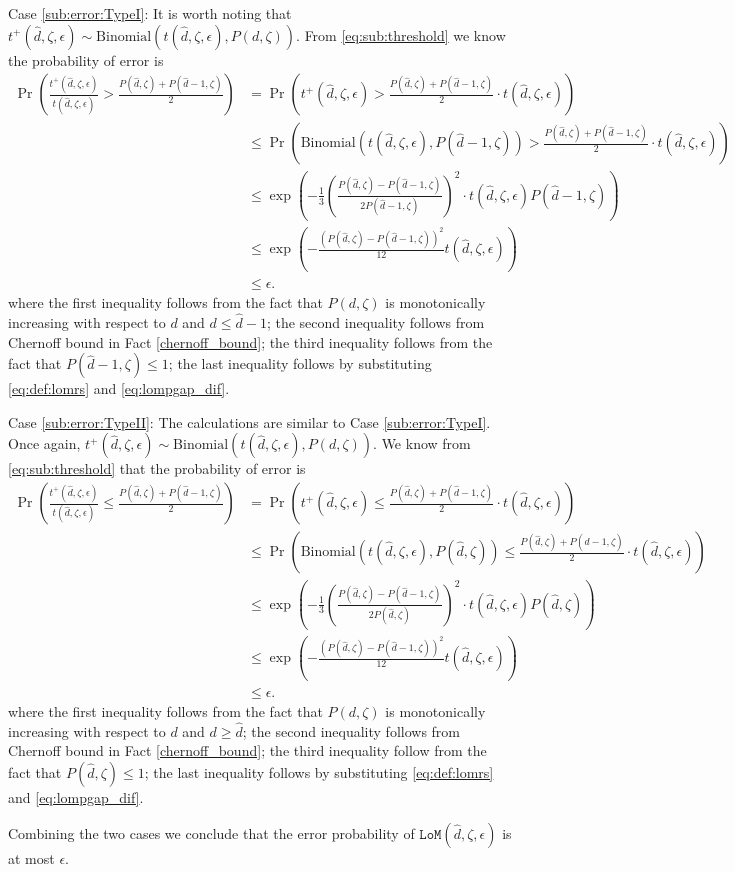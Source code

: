 \documentclass[onecolumn,letterpaper]{IEEEtran}
\newcommand{\lom}{{\texttt{LoM}}}
\newcommand{\lomerr}{{\epsilon}}
\newcommand{\ud}{{\hat{d}}}
\newcommand{\lomp}{{P}}
\newcommand{\lomcp}{{\zeta}}
\newcommand{\lomrs}{{t(\ud,\lomcp,\lomerr)}}
\newcommand{\lompo}{{t^{+}(\ud,\lomcp,\lomerr)}}
\newcommand{\lomppd}{{\lomp(d,\lomcp)}}
\newcommand{\lompp}{{\lomp(\ud,\lomcp)}}
\newcommand{\lomppo}{{\lomp(\ud-1,\lomcp)}}
\begin{document}
\begin{IEEEproof}
    Case \ref{sub:error:TypeI}: It is worth noting that $\lompo \sim \text{Binomial} \left(\lomrs , \lomppd\right)$. From \eqref{eq:sub:threshold} we know the probability of error is
    \begin{align*}
        \Pr \left( \frac{\lompo}{\lomrs} > \frac{\lompp + \lomppo}{2} \right) &= \Pr \left( \lompo > \frac{\lompp + \lomppo}{2}\cdot\lomrs \right)\\
        &\le \Pr \left( \text{Binomial} \left(\lomrs , \lomppo\right) > \frac{\lompp + \lomppo}{2} \cdot \lomrs \right) \\
        &\le \exp \left( -\frac{1}{3} \left( \frac{\lompp-\lomppo}{2\lomppo} \right)^2 \cdot\lomrs \lomppo\right) \\
        &\le \exp \left( - \frac{\left(\lompp-\lomppo\right)^2}{12} \lomrs \right) \\
        &\leq \lomerr.
    \end{align*}
       where the first inequality follows from the fact that $\lomppd$ is monotonically increasing with respect to $d$ and $d \leq \ud-1$; the second inequality follows from Chernoff bound in Fact \ref{chernoff_bound}; the third inequality follows from the fact that $\lomppo\leq 1$; the last inequality follows by substituting \eqref{eq:def:lomrs} and \eqref{eq:lompgap_dif}.


    Case \ref{sub:error:TypeII}: The calculations are similar to Case \ref{sub:error:TypeI}. Once again,  $\lompo \sim \text{Binomial} \left(\lomrs , \lomppd\right)$. We know from \eqref{eq:sub:threshold} that the probability of error is
    \begin{align*}
        \Pr \left( \frac{\lompo}{\lomrs} \le \frac{\lompp + \lomppo}{2} \right) &= \Pr \left( \lompo \le \frac{\lompp + \lomppo}{2}\cdot\lomrs \right)\\
        &\le \Pr \left( \text{Binomial} \left(\lomrs , \lompp\right) \le \frac{\lompp + \lomppo}{2} \cdot \lomrs \right) \\
        &\le \exp \left( -\frac{1}{3} \left( \frac{\lompp-\lomppo}{2\lompp} \right)^2 \cdot\lomrs \lompp\right) \\
        &\le \exp \left( - \frac{\left(\lompp-\lomppo\right)^2}{12} \lomrs \right) \\
        &\leq \lomerr.
    \end{align*}
     where the first inequality follows from the fact that $\lomppd$ is monotonically increasing with respect to $d$ and $d \ge \ud$; the second inequality follows from Chernoff bound in Fact \ref{chernoff_bound}; the third inequality follow from the fact that $\lompp\leq 1$; the last inequality follows by substituting \eqref{eq:def:lomrs} and \eqref{eq:lompgap_dif}.


    Combining the two cases we conclude that the error probability of $\lom(\ud,\lomcp,\lomerr)$  is at most $\lomerr$.
\end{IEEEproof}
\end{document}
